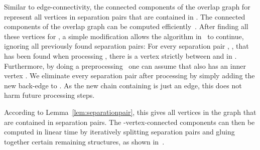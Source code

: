 \documentclass[paper=a4]{scrartcl}
\begin{document}
Similar to edge-connectivity, the connected components of the overlap graph for  represent all vertices in separation pairs that are contained in . The connected components of the overlap graph can be computed efficiently~\cite[Lemma~51]{Schmidt2013}. After finding all these vertices for , a simple modification allows the algorithm in~\cite[p.\ 508]{Schmidt2013} to continue, ignoring all previously found separation pairs: For every separation pair , , that has been found when processing , there is a vertex  strictly between  and  in . Furthermore, by doing a preprocessing~\cite[Property~B, p.\ 508]{Schmidt2013} one can assume that  also has an inner vertex . We eliminate every separation pair  after processing  by simply adding the new back-edge  to . As the new chain containing  is just an edge, this does not harm future processing steps.

According to Lemma~\ref{lem:separationpair}, this gives all vertices in the graph that are contained in separation pairs. The -vertex-connected components can then be computed in linear time by iteratively splitting separation pairs and gluing together certain remaining structures, as shown in~\cite{Hopcroft1973,Gutwenger2001}.
\end{document}
